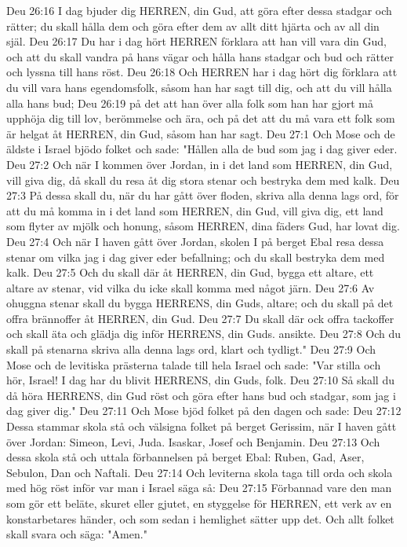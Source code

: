 Deu 26:16  I dag bjuder dig HERREN, din Gud, att göra efter dessa stadgar och rätter; du skall hålla dem och göra efter dem av allt ditt hjärta och av all din själ.
Deu 26:17  Du har i dag hört HERREN förklara att han vill vara din Gud, och att du skall vandra på hans vägar och hålla hans stadgar och bud och rätter och lyssna till hans röst.
Deu 26:18  Och HERREN har i dag hört dig förklara att du vill vara hans egendomsfolk, såsom han har sagt till dig, och att du vill hålla alla hans bud;
Deu 26:19  på det att han över alla folk som han har gjort må upphöja dig till lov, berömmelse och ära, och på det att du må vara ett folk som är helgat åt HERREN, din Gud, såsom han har sagt.
Deu 27:1  Och Mose och de äldste i Israel bjödo folket och sade: "Hållen alla de bud som jag i dag giver eder.
Deu 27:2  Och när I kommen över Jordan, in i det land som HERREN, din Gud, vill giva dig, då skall du resa åt dig stora stenar och bestryka dem med kalk.
Deu 27:3  På dessa skall du, när du har gått över floden, skriva alla denna lags ord, för att du må komma in i det land som HERREN, din Gud, vill giva dig, ett land som flyter av mjölk och honung, såsom HERREN, dina fäders Gud, har lovat dig.
Deu 27:4  Och när I haven gått över Jordan, skolen I på berget Ebal resa dessa stenar om vilka jag i dag giver eder befallning; och du skall bestryka dem med kalk.
Deu 27:5  Och du skall där åt HERREN, din Gud, bygga ett altare, ett altare av stenar, vid vilka du icke skall komma med något järn.
Deu 27:6  Av ohuggna stenar skall du bygga HERRENS, din Guds, altare; och du skall på det offra brännoffer åt HERREN, din Gud.
Deu 27:7  Du skall där ock offra tackoffer och skall äta och glädja dig inför HERRENS, din Guds. ansikte.
Deu 27:8  Och du skall på stenarna skriva alla denna lags ord, klart och tydligt."
Deu 27:9  Och Mose och de levitiska prästerna talade till hela Israel och sade: "Var stilla och hör, Israel! I dag har du blivit HERRENS, din Guds, folk.
Deu 27:10  Så skall du då höra HERRENS, din Gud röst och göra efter hans bud och stadgar, som jag i dag giver dig."
Deu 27:11  Och Mose bjöd folket på den dagen och sade:
Deu 27:12  Dessa stammar skola stå och välsigna folket på berget Gerissim, när I haven gått över Jordan: Simeon, Levi, Juda. Isaskar, Josef och Benjamin.
Deu 27:13  Och dessa skola stå och uttala förbannelsen på berget Ebal: Ruben, Gad, Aser, Sebulon, Dan och Naftali.
Deu 27:14  Och leviterna skola taga till orda och skola med hög röst inför var man i Israel säga så:
Deu 27:15  Förbannad vare den man som gör ett beläte, skuret eller gjutet, en styggelse för HERREN, ett verk av en konstarbetares händer, och som sedan i hemlighet sätter upp det. Och allt folket skall svara och säga: "Amen."
